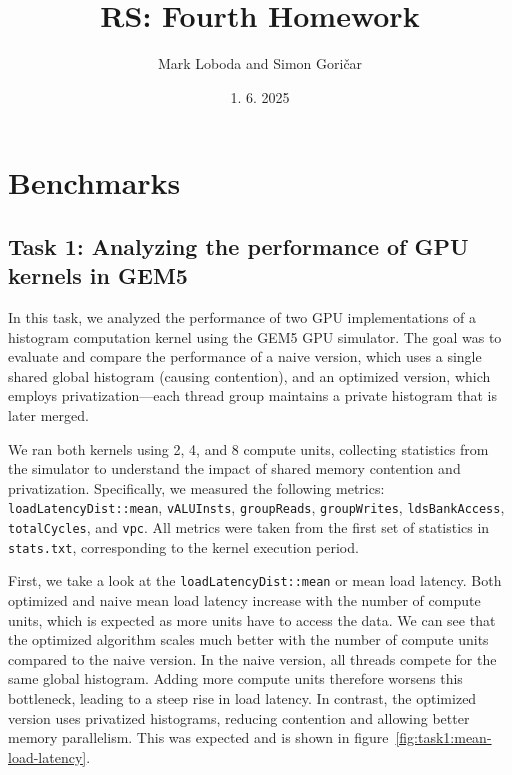 \documentclass[10pt]{article}
\title{RS: Fourth Homework}
\author{
    Mark Loboda and Simon Goričar
}
\date{1. 6. 2025}
\begin{document}
\maketitle

\section{Benchmarks}

\subsection{Task 1: Analyzing the performance of GPU kernels in GEM5}
In this task, we analyzed the performance of two GPU implementations of a histogram computation kernel using the GEM5 GPU simulator. The goal was to evaluate and compare the performance of a naive version, which uses a single shared global histogram (causing contention), and an optimized version, which employs privatization—each thread group maintains a private histogram that is later merged.

We ran both kernels using 2, 4, and 8 compute units, collecting statistics from the simulator to understand the impact of shared memory contention and privatization. Specifically, we measured the following metrics: \texttt{loadLatencyDist::mean}, \texttt{vALUInsts}, \texttt{groupReads}, \texttt{groupWrites}, \texttt{ldsBankAccess}, \texttt{totalCycles}, and \texttt{vpc}. All metrics were taken from the first set of statistics in \texttt{stats.txt}, corresponding to the kernel execution period.

First, we take a look at the \texttt{loadLatencyDist::mean} or mean load latency. Both optimized and naive mean load latency increase with the number of compute units, which is expected as more units have to access the data. We can see that the optimized algorithm scales much better with the number of compute units compared to the naive version. In the naive version, all threads compete for the same global histogram. Adding more compute units therefore worsens this bottleneck, leading to a steep rise in load latency. In contrast, the optimized version uses privatized histograms, reducing contention and allowing better memory parallelism. This was expected and is shown in figure~\ref{fig:task1:mean-load-latency}.
\end{document}

